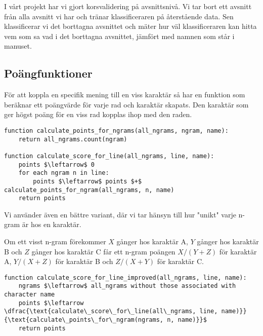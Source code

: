 \documentclass[a4paper]{article}
\begin{document}
I vårt projekt har vi gjort korsvalidering på avsnittsnivå. Vi tar bort ett
avsnitt från alla avsnitt vi har och tränar klassificeraren på återstående data.
Sen klassificerar vi det borttagna avsnittet och mäter hur väl klassificeraren
kan hitta vem som sa vad i det borttagna avsnittet, jämfört med namnen som står
i manuset.

\subsection{Poängfunktioner}
För att koppla en specifik mening till en viss karaktär så har en funktion som
beräknar ett poängvärde för varje rad och karaktär skapats. Den karaktär som ger
högst poäng för en viss rad kopplas ihop med den raden.

\begin{lstlisting}[mathescape, columns=fullflexible, basicstyle=\fontfamily{lmvtt}\selectfont]
function calculate_points_for_ngrams(all_ngrams, ngram, name):
    return all_ngrams.count(ngram)

function calculate_score_for_line(all_ngrams, line, name):
    points $\leftarrow$ 0
    for each ngram n in line:
        points $\leftarrow$ points $+$ calculate_points_for_ngram(all_ngrams, n, name)
    return points
\end{lstlisting}

Vi använder även en bättre variant, där vi tar hänsyn till hur "unikt" varje
n-gram är hos en karaktär.

Om ett visst n-gram förekommer $X$ gånger hos karaktär A, $Y$ gånger hos karaktär B
och $Z$ gånger hos karaktär C får ett n-gram poängen $X/(Y+Z)$ för karaktär A,
$Y/(X+Z)$ för karaktär B och $Z/(X+Y)$ för karaktär C.

\begin{lstlisting}[mathescape, columns=fullflexible, basicstyle=\fontfamily{lmvtt}\selectfont]
function calculate_score_for_line_improved(all_ngrams, line, name):
    ngrams $\leftarrow$ all_ngrams without those associated with character name 
    points $\leftarrow  \dfrac{\text{calculate\_score\_for\_line(all\_ngrams, line, name)}}{\text{calculate\_points\_for\_ngram(ngrams, n, name)}}$
    return points
\end{lstlisting}
\end{document}
